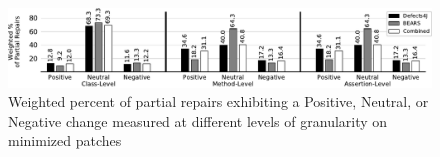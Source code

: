 \documentclass[10pt, conference]{IEEEtran}
\newcommand\todo[1]{\textcolor{red}{#1}}
\newcommand\bears{\textsc{Bears}\xspace}
\begin{document}

\begin{figure}
        \includegraphics[width=\textwidth]{img/weighted_percent.pdf}
        \caption{Weighted percent of partial repairs exhibiting a {\normalfont Positive}, {\normalfont Neutral}, or {\normalfont Negative} change measured at different levels of granularity on minimized patches}
        \label{fig:fitness}
\end{figure}
\end{document}
